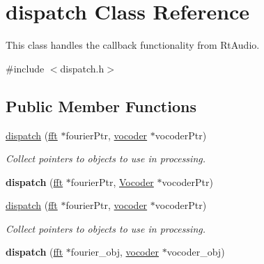 \hypertarget{classdispatch}{\section{dispatch Class Reference}
\label{classdispatch}
}


This class handles the callback functionality from Rt\-Audio.  




{\ttfamily \#include $<$dispatch.\-h$>$}

\subsection*{Public Member Functions}
\begin{DoxyCompactItemize}
\item 
\hypertarget{classdispatch_a641ec1136a8fdecb8b9ab51fa672a848}{\hyperlink{classdispatch_a641ec1136a8fdecb8b9ab51fa672a848}{dispatch} (\hyperlink{classfft}{fft} $\ast$fourier\-Ptr, \hyperlink{classvocoder}{vocoder} $\ast$vocoder\-Ptr)}\label{classdispatch_a641ec1136a8fdecb8b9ab51fa672a848}

\begin{DoxyCompactList}\small\item\em Collect pointers to objects to use in processing. \end{DoxyCompactList}\item 
\hypertarget{classdispatch_a86ed8ac03c8498d7f75619af8eaff3a2}{{\bfseries dispatch} (\hyperlink{classfft}{fft} $\ast$fourier\-Ptr, \hyperlink{classVocoder}{Vocoder} $\ast$vocoder\-Ptr)}\label{classdispatch_a86ed8ac03c8498d7f75619af8eaff3a2}

\item 
\hypertarget{classdispatch_a641ec1136a8fdecb8b9ab51fa672a848}{\hyperlink{classdispatch_a641ec1136a8fdecb8b9ab51fa672a848}{dispatch} (\hyperlink{classfft}{fft} $\ast$fourier\-Ptr, \hyperlink{classvocoder}{vocoder} $\ast$vocoder\-Ptr)}\label{classdispatch_a641ec1136a8fdecb8b9ab51fa672a848}

\begin{DoxyCompactList}\small\item\em Collect pointers to objects to use in processing. \end{DoxyCompactList}\item 
\hypertarget{classdispatch_a49638cdbc0fee44e411973f09fc64d83}{{\bfseries dispatch} (\hyperlink{classfft}{fft} $\ast$fourier\-\_\-obj, \hyperlink{classvocoder}{vocoder} $\ast$vocoder\-\_\-obj)}\label{classdispatch_a49638cdbc0fee44e411973f09fc64d83}

\end{DoxyCompactItemize}
